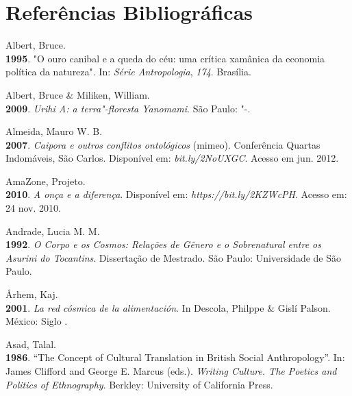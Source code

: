 
\chapter{Referências
Bibliográficas}\label{referuxeancias-bibliogruxe1ficas}


\begin{Parskip}
Albert, Bruce.\\
\textbf{1995}. "O ouro canibal e a queda do céu: uma crítica xamânica da
economia política da natureza". In: \emph{Série Antropologia},
\emph{174}. Brasília.

Albert, Bruce \& Miliken, William.\\
\textbf{2009}. \emph{Urihi A: a terra"-floresta Yanomami}. São Paulo:
"-.

Almeida, Mauro W. B.\\
\textbf{2007}. \emph{Caipora e outros conflitos ontológicos} (mimeo).
Conferência Quartas Indomáveis, São Carlos. Disponível em:
\emph{bit.ly/2NoUXGC}. Acesso em jun. 2012.

AmaZone, Projeto.\\
\textbf{2010}. \emph{A onça e a diferença}. Disponível em:
\emph{https://bit.ly/2KZWcPH}.
Acesso em: 24 nov. 2010.

Andrade, Lucia M. M.\\
\textbf{1992}. \emph{O Corpo e os Cosmos: Relações de Gênero e o
Sobrenatural entre os Asurini do Tocantins}. Dissertação de Mestrado.
São Paulo: Universidade de São Paulo.

Århem, Kaj.\\
\textbf{2001}. \emph{La red cósmica de la alimentación}. In Descola,
Philppe \& Gislí Palson. México: Siglo .

Asad, Talal.\\
\textbf{1986}. ``The Concept of Cultural Translation in British Social
Anthropology''. In: James Clifford and George E. Marcus (eds.).
\emph{Writing Culture. The Poetics and Politics of Ethnography}.
Berkley: University of California Press.


\end{Parskip}

